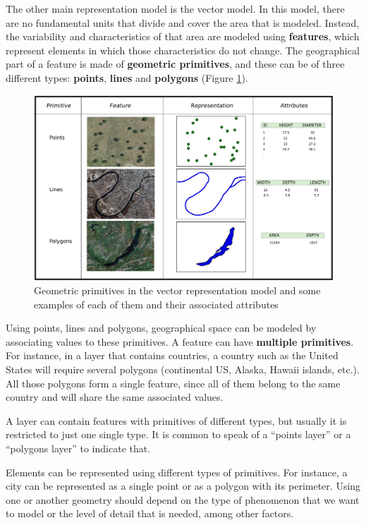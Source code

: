 The other main representation model is the vector model. In this model, there are no fundamental units that divide and cover the area that is modeled. Instead, the variability and characteristics of that area are modeled using \textbf{features}, which represent elements in which those characteristics do not change. The geographical part of a feature is made of \textbf{geometric primitives}, and these can be of three different types: \textbf{points}, \textbf{lines} and \textbf{polygons} (Figure \ref{Fig:Primitives}).

\begin{figure}[!hbt]   
\centering
\includegraphics[width=\textwidth]{Data/Primitives.pdf}
\caption{\small Geometric primitives in the vector representation model and some examples of each of them and their associated attributes}
\label{Fig:Primitives} 
\end{figure}

Using points, lines and polygons, geographical space can be modeled by associating values to these primitives. A feature can have \textbf{multiple primitives}. For instance, in a layer that contains countries, a country such as the United States will require several polygons (continental US, Alaska, Hawaii islands, etc.). All those polygons form a single feature, since all of them belong to the same country and will share the same associated values.

A layer can contain features with primitives of different types, but usually it is restricted to just one single type. It is common to speak of a ``points layer'' or a ``polygons layer'' to indicate that. 

Elements can be represented using different types of primitives. For instance, a city can be represented as a single point or as a polygon with its perimeter. Using one or another geometry should depend on the type of phenomenon that we want to model or the level of detail that is needed, among other factors.

